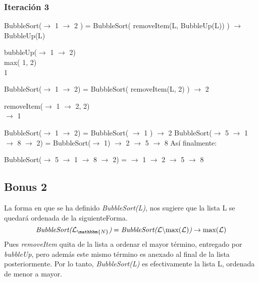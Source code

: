 \subsubsection{Iteración 3}
 BubbleSort($\to$ 1 $\to$ 2 ) = BubbleSort( removeItem(L, BubbleUp(L)) ) $\to$ BubbleUp(L)
 \begin{center}
   bubbleUp($\to$ 1 $\to$ 2)\\
   max( 1, 2)\\
   1\\
 \end{center}
 BubbleSort($\to$ 1 $\to$ 2) = BubbleSort( removeItem(L, 2) ) $\to$ 2
 \begin{center}
    removeItem($\to$ 1 $\to$ 2, 2)\\
    $\to$ 1\\
 \end{center}
 BubbleSort($\to$ 1 $\to$ 2) = BubbleSort( $\to$ 1 ) $\to$ 2\newline
 BubbleSort($\to$ 5 $\to$ 1 $\to$ 8 $\to$ 2) = BubbleSort($\to$ 1) $\to$ 2 $\to$ 5 $\to$ 8\newline
 \newline
 Así finalmente:
 \begin{center}
     BubbleSort($\to$ 5 $\to$ 1 $\to$ 8 $\to$ 2) = $\to$ 1 $\to$ 2 $\to$ 5 $\to$ 8
 \end{center}

\subsection{Bonus 2}
La forma en que se ha definido \textit{BubbleSort(L)}, nos sugiere que la lista L se quedará ordenada de la siguienteForma.
\begin{equation*}
\textit{BubbleSort(}\mathcal{L}_{\mathbbm{N}}\textit{)} = \textit{BubbleSort(} \mathcal{L}\backslash\text{max(}\mathcal{L}\text{)} \textit{)} \to \text{max(}\mathcal{L}\text{)}
\end{equation*}
Pues \textit{removeItem} quita de la lista a ordenar el mayor término, entregado por \textit{bubbleUp}, pero además este mismo término es anexado al final de la lista posteriormente.
Por lo tanto, \textit{BubbleSort(L)} es efectivamente la lista L, ordenada de menor a mayor.
